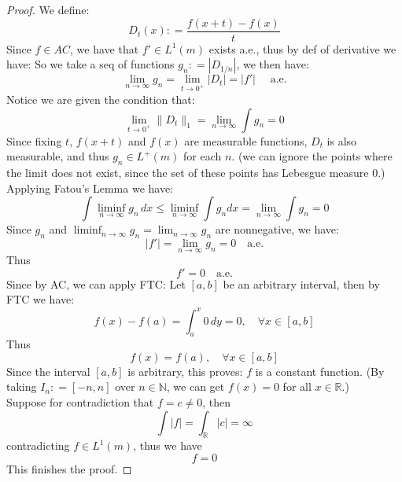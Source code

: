\documentclass[lang=cn,11pt]{elegantbook}
\begin{document}
\begin{proof}
    We define: \[
    D_t(x) : = \frac{f(x+t) -f(x)}{t}
    \]
    Since $f \in AC$, we have that $f'\in L^1(m)$ exists a.e., thus by def of derivative we have: 
    So we take a seq of functions $g_n : = |D_{1/n}|$, we then have: \[
    \lim_{n\to \infty} g_n =   \lim_{t\to 0^+} |D_t| = |f'|\quad  \text{ a.e.}
    \]
    Notice we are given the condition that: \[
    \lim_{t\to 0^+} \| D_t\|_1 =  \lim_{n\to \infty} \int g_n  = 0
    \]
   Since fixing $t$, $f(x+t)$ and $f(x) $ are measurable functions, $D_t$ is also measurable, and thus $g_n \in L^+(m)$ for each $n$. (we can ignore the points where the limit does not exist, since the set of these points has Lebesgue measure $0$.)\\ 
    Applying Fatou's Lemma we have: $$
\int \liminf _{n \rightarrow \infty}g_n\,  d x \leq \liminf _{n \rightarrow \infty} \int g_n d x =  \lim_{n\to \infty} \int g_n  = 0
$$
Since $g_n$ and $\liminf_{n\to \infty} g_n = \lim_{n\to \infty} g_n$ are nonnegative, we have: \[
|f'| =     \lim_{n\to \infty} g_n  = 0 \quad \text{a.e.}
\]
Thus \[
f' = 0\quad \text{a.e.}
\]
Since by AC, we can apply FTC: Let $[a,b]$ be an arbitrary interval, then by FTC we have: \[
f(x)  - f(a) = \int_a^x 0 \, dy = 0,\quad \forall x\in [a,b]
\]
Thus \[
f(x) = f(a) ,\quad \forall x\in [a,b]
\]
Since the interval $[a,b]$ is arbitrary, this proves: $f$ is a constant function. (By taking $I_n : = [-n,n]$ over $n\in\mathbb{N}$, we can get $f(x) = 0$ for all $x\in \mathbb{R}$.)\\
Suppose for contradiction that $f= c \not = 0 $, then \[
\int |f| = \int_{\mathbb{R}} |c|   = \infty
\]contradicting $f \in L^1(m)$, thus we have \[
f = 0
\]This finishes the proof.
\end{proof}
\end{document}
